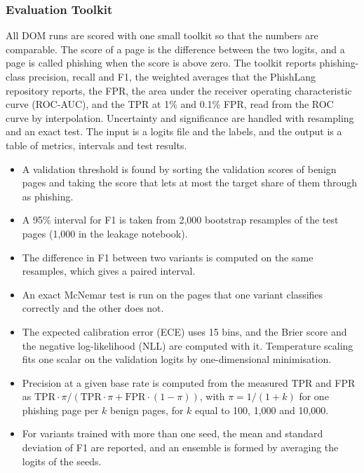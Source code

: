 \documentclass{FastFyp}
\begin{document}
\subsubsection{Evaluation Toolkit}
\label{sec:impl-eval}
All DOM runs are scored with one small toolkit so that the numbers are comparable. The score of a page is the difference between the two logits, and a page is called phishing when the score is above zero. The toolkit reports phishing-class precision, recall and F1, the weighted averages that the PhishLang repository reports, the FPR, the area under the receiver operating characteristic curve (ROC-AUC), and the TPR at 1\% and 0.1\% FPR, read from the ROC curve by interpolation. Uncertainty and significance are handled with resampling and an exact test. The input is a logits file and the labels, and the output is a table of metrics, intervals and test results.
\begin{itemize}
	\item A validation threshold is found by sorting the validation scores of benign pages and taking the score that lets at most the target share of them through as phishing.
	\item A 95\% interval for F1 is taken from 2,000 bootstrap resamples of the test pages (1,000 in the leakage notebook).
	\item The difference in F1 between two variants is computed on the same resamples, which gives a paired interval.
	\item An exact McNemar test is run on the pages that one variant classifies correctly and the other does not.
	\item The expected calibration error (ECE) uses 15 bins, and the Brier score and the negative log-likelihood (NLL) are computed with it. Temperature scaling fits one scalar on the validation logits by one-dimensional minimisation.
	\item Precision at a given base rate is computed from the measured TPR and FPR as $\mathrm{TPR}\cdot\pi / (\mathrm{TPR}\cdot\pi + \mathrm{FPR}\cdot(1-\pi))$, with $\pi = 1/(1+k)$ for one phishing page per $k$ benign pages, for $k$ equal to 100, 1,000 and 10,000.
	\item For variants trained with more than one seed, the mean and standard deviation of F1 are reported, and an ensemble is formed by averaging the logits of the seeds.
\end{itemize}
\end{document}
